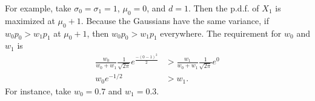 \documentclass[a4paper,12pt]{article}
\theoremstyle{remark}
\begin{document}
    For example, take $\sigma_0 = \sigma_1 = 1$, $\mu_0 = 0$, and $d = 1$. Then the p.d.f. of $X_1$ is maximized at $\mu_0 + 1$. Because the Gaussians have the same variance, if $w_0 p_0 > w_1 p_1$ at $\mu_0 + 1$, then $w_0 p_0 > w_1 p_1$ everywhere. The requirement for $w_0$ and $w_1$ is
    \begin{align*}
        \frac{w_0}{w_0 + w_1} \frac{1}{\sqrt{2\pi}} e^{\frac{-(0 - 1)^2}{2}} &> \frac{w_1}{w_0 + w_1} \frac{1}{\sqrt{2\pi}} e^0 \\
        w_0 e^{-1/2} &> w_1.
    \end{align*}
    For instance, take $w_0 = 0.7$ and $w_1 = 0.3$.



\end{document}

